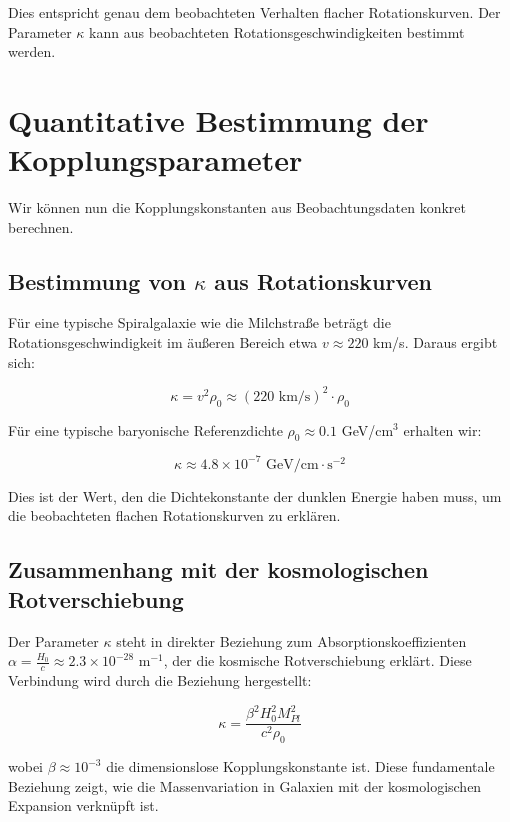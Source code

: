 \documentclass[a4paper,12pt]{article}
\begin{document}
	Dies entspricht genau dem beobachteten Verhalten flacher Rotationskurven. Der Parameter $\kappa$ kann aus beobachteten Rotationsgeschwindigkeiten bestimmt werden.
	
	\section{Quantitative Bestimmung der Kopplungsparameter}
	
	Wir können nun die Kopplungskonstanten aus Beobachtungsdaten konkret berechnen.
	
	\subsection{Bestimmung von $\kappa$ aus Rotationskurven}
	
	Für eine typische Spiralgalaxie wie die Milchstraße beträgt die Rotationsgeschwindigkeit im äußeren Bereich etwa $v \approx 220$ km/s. Daraus ergibt sich:
	
	\begin{equation}
		\kappa = v^2 \rho_0 \approx (220 \text{ km/s})^2 \cdot \rho_0
	\end{equation}
	
	Für eine typische baryonische Referenzdichte $\rho_0 \approx 0.1$ GeV/cm$^3$ erhalten wir:
	
	\begin{equation}
		\kappa \approx 4.8 \times 10^{-7} \text{ GeV/cm} \cdot \text{s}^{-2}
	\end{equation}
	
	Dies ist der Wert, den die Dichtekonstante der dunklen Energie haben muss, um die beobachteten flachen Rotationskurven zu erklären.
	
	\subsection{Zusammenhang mit der kosmologischen Rotverschiebung}
	
	Der Parameter $\kappa$ steht in direkter Beziehung zum Absorptionskoeffizienten $\alpha = \frac{H_0}{c} \approx 2.3 \times 10^{-28}$ m$^{-1}$, der die kosmische Rotverschiebung erklärt. Diese Verbindung wird durch die Beziehung hergestellt:
	
	\begin{equation}
		\kappa = \frac{\beta^2 H_0^2 M_{Pl}^2}{c^2 \rho_0}
	\end{equation}
	
	wobei $\beta \approx 10^{-3}$ die dimensionslose Kopplungskonstante ist. Diese fundamentale Beziehung zeigt, wie die Massenvariation in Galaxien mit der kosmologischen Expansion verknüpft ist.
	
\end{document}
